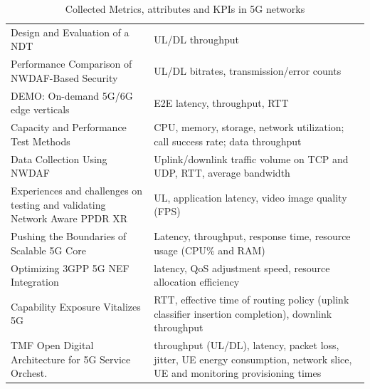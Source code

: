 \begin{table}[ht]
\begin{tabular}{p{4cm} p{11cm}}
Design and Evaluation of a \acs{NDT}~\cite{DesignAndEvaluationNetworkDigitalTwin} & \acs{UL}/\acs{DL} throughput \\
Performance Comparison of NWDAF-Based Security~\cite{PerformanceComparisonNWDAFSecurity} & \acs{UL}/\acs{DL} bitrates, transmission/error counts \\
DEMO: On-demand 5G/6G edge verticals~\cite{DemoOnDemand5GEdgeVerticalsViaThirdPartyUPF} & \acs{E2E} latency, throughput, \acs{RTT} \\
Capacity and Performance Test Methods~\cite{CapacityPerformanceTestMethodsCloudNF} & \acs{CPU}, memory, storage, network utilization; call success rate; data throughput \\
Data Collection Using \acs{NWDAF}~\cite{DataCollectionUsingNWDAF5GCN} & Uplink/downlink traffic volume on \acs{TCP} and \acs{UDP}, \acs{RTT}, average bandwidth \\
Experiences and challenges on testing and validating Network Aware \acs{PPDR} \acs{XR}~\cite{ExperiencesChallengesTestingValidatingNetworkAware} & \acs{UL}, application latency, video image quality (\acs{FPS}) \\
Pushing the Boundaries of Scalable 5G Core~\cite{pushingBoundariesScalable5GCN} & Latency, throughput, response time, resource usage (\acs{CPU}\% and \acs{RAM}) \\
Optimizing \acs{3GPP} \acs{5G} \acs{NEF} Integration~\cite{optimizing5GNEFIntegrationThroughNEFandUPF} & latency, \acs{QoS} adjustment speed, resource allocation efficiency \\
Capability Exposure Vitalizes \acs{5G}~\cite{CapabilityExposureVitalizes5GNetwork} & \acs{RTT}, effective time of routing policy (uplink classifier insertion completion), downlink throughput \\
\acs{TMF} Open Digital Architecture for \acs{5G} Service Orchest.~\cite{TMFOpenDigitalArchitecture5GServiceOrchestration} & throughput (\acs{UL}/\acs{DL}), latency, packet loss, jitter, \acs{UE} energy consumption, network slice, \acs{UE} and monitoring provisioning times \\
\bottomrule
\end{tabular}
\caption{Collected Metrics, attributes and \acsp{KPI} in \acs{5G} networks}
\label{tab:metrics:all}
\end{table}